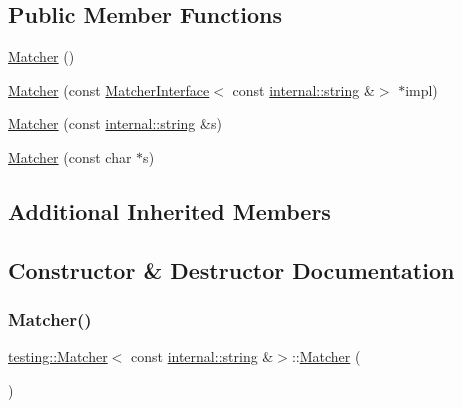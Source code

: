\subsection*{Public Member Functions}
\begin{DoxyCompactItemize}
\item 
\hyperlink{classtesting_1_1_matcher_3_01const_01internal_1_1string_01_6_4_a4a2a2e3e0ef1007d8432e9e0ea8df979}{Matcher} ()
\item 
\hyperlink{classtesting_1_1_matcher_3_01const_01internal_1_1string_01_6_4_aa35956335ee37d048c49945b904c1fb9}{Matcher} (const \hyperlink{classtesting_1_1_matcher_interface}{Matcher\+Interface}$<$ const \hyperlink{namespacetesting_1_1internal_a8e8ff5b11e64078831112677156cb111}{internal\+::string} \&$>$ $\ast$impl)
\item 
\hyperlink{classtesting_1_1_matcher_3_01const_01internal_1_1string_01_6_4_a5014c9227335b575a1c0167b9c609bf8}{Matcher} (const \hyperlink{namespacetesting_1_1internal_a8e8ff5b11e64078831112677156cb111}{internal\+::string} \&s)
\item 
\hyperlink{classtesting_1_1_matcher_3_01const_01internal_1_1string_01_6_4_accc8b69db530a019efa2a1d6436eb3db}{Matcher} (const char $\ast$s)
\end{DoxyCompactItemize}
\subsection*{Additional Inherited Members}


\subsection{Constructor \& Destructor Documentation}
\mbox{\label{classtesting_1_1_matcher_3_01const_01internal_1_1string_01_6_4_a4a2a2e3e0ef1007d8432e9e0ea8df979}} 
\subsubsection{\texorpdfstring{Matcher()}{Matcher()}\hspace{0.1cm}{\footnotesize\ttfamily [1/4]}}
{\footnotesize\ttfamily \hyperlink{classtesting_1_1_matcher}{testing\+::\+Matcher}$<$ const \hyperlink{namespacetesting_1_1internal_a8e8ff5b11e64078831112677156cb111}{internal\+::string} \&$>$\+::\hyperlink{classtesting_1_1_matcher}{Matcher} (\begin{DoxyParamCaption}{ }\end{DoxyParamCaption})\hspace{0.3cm}{\ttfamily [inline]}}

